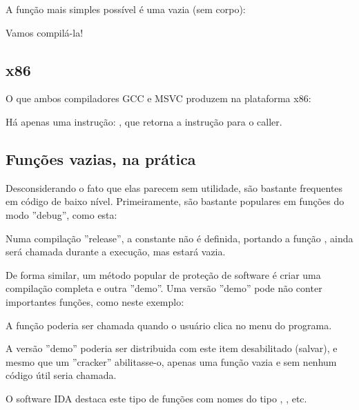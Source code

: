 \label{empty_func}

A função mais simples possível é uma vazia (sem corpo):



Vamos compilá-la!

\subsection{x86}

O que ambos compiladores GCC e MSVC produzem na plataforma x86:



Há apenas uma instrução: \RET, que retorna a instrução para o \gls{caller}.

\subsection{Funções vazias, na prática}

Desconsiderando o fato que elas parecem sem utilidade, são bastante frequentes em código de baixo nível.
Primeiramente, são bastante populares em funções do modo ''debug'', como esta:



Numa compilação ''release'', a constante  não é definida,
portando a função , ainda será chamada durante a execução,
mas estará vazia.

De forma similar, um método popular de proteção de software é criar uma compilação completa e outra ''demo''. Uma versão ''demo'' pode não conter importantes funções, como neste exemplo:



A função  poderia ser chamada quando o usuário clica  no menu do programa. 

A versão ''demo'' poderia ser distribuida com este item desabilitado (salvar), e mesmo que um ''cracker'' abilitasse-o, apenas uma função vazia e sem nenhum código útil seria chamada.

O software IDA destaca este tipo de funções com nomes do tipo , , etc.

